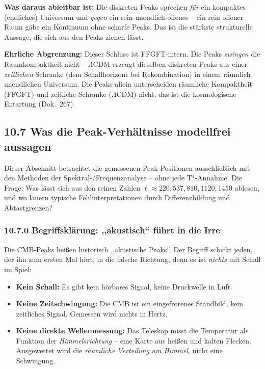 \textbf{Was daraus ableitbar ist:} Die diskreten Peaks sprechen
\emph{für} ein kompaktes (endliches) Universum und \emph{gegen} ein
rein-unendlich-offenes -- ein rein offener Raum gäbe ein Kontinuum
ohne scharfe Peaks. Das ist die stärkste strukturelle Aussage, die
sich aus den Peaks ziehen lässt.

\textbf{Ehrliche Abgrenzung:} Dieser Schluss ist FFGFT-intern. Die
Peaks \emph{zwingen} die Raumkompaktheit nicht -- $\Lambda$CDM erzeugt
dieselben diskreten Peaks aus einer \emph{zeitlichen} Schranke (dem
Schallhorizont bei Rekombination) in einem räumlich unendlichen
Universum. Die Peaks allein unterscheiden räumliche Kompaktheit
(FFGFT) und zeitliche Schranke ($\Lambda$CDM) nicht; das ist die
kosmologische Entartung (Dok.~267).

\subsection*{10.7 Was die Peak-Verhältnisse modellfrei aussagen}

Dieser Abschnitt betrachtet die gemessenen Peak-Positionen ausschließlich
mit den Methoden der Spektral-/Frequenzanalyse -- ohne jede
T$^4$-Annahme. Die Frage: Was lässt sich aus den reinen Zahlen
$\ell \approx 220, 537, 810, 1120, 1450$ ablesen, und wo lauern
typische Fehlinterpretationen durch Differenzbildung und Abtastgrenzen?

\subsubsection*{10.7.0 Begriffsklärung: ,,akustisch`` führt in die Irre}

Die CMB-Peaks heißen historisch ,,akustische Peaks``. Der Begriff
schickt jeden, der ihn zum ersten Mal hört, in die falsche Richtung,
denn es ist \emph{nichts} mit Schall im Spiel:

\begin{itemize}
  \item \textbf{Kein Schall:} Es gibt kein hörbares Signal, keine
        Druckwelle in Luft.
  \item \textbf{Keine Zeitschwingung:} Die CMB ist ein eingefrorenes
        Standbild, kein zeitliches Signal. Gemessen wird nichts in Hertz.
  \item \textbf{Keine direkte Wellenmessung:} Das Teleskop misst die
        Temperatur als Funktion der \emph{Himmelsrichtung} -- eine Karte
        aus heißen und kalten Flecken. Ausgewertet wird die
        \emph{räumliche Verteilung am Himmel}, nicht eine Schwingung.
\end{itemize}

